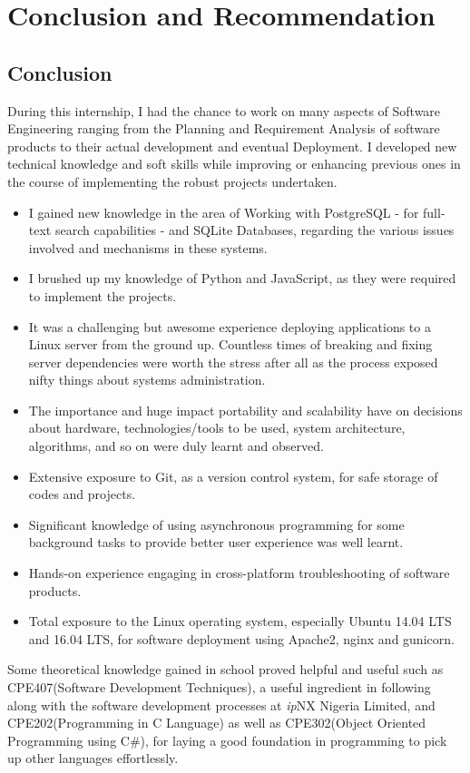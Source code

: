 \chapter{Conclusion and Recommendation}
\section{Conclusion}
During this internship, I had the chance to work on many aspects of Software Engineering ranging from the Planning and Requirement Analysis of software products to their actual development and eventual Deployment. I developed new technical knowledge and soft skills while improving or enhancing previous ones in the course of implementing the robust projects undertaken.
\begin{itemize}
	\item I gained new knowledge in the area of Working with PostgreSQL - for full-text search capabilities - and SQLite Databases, regarding the various issues involved and mechanisms in these systems.
	\item I brushed up my knowledge of Python and JavaScript, as they were required to implement the projects.
	\item It was a challenging but awesome experience deploying applications to a Linux server from the ground up. Countless times of breaking and fixing server dependencies were worth the stress after all as the process exposed nifty things about systems administration.
	\item The importance and huge impact portability and scalability have on decisions about hardware, technologies/tools to be used, system architecture, algorithms, and so on were duly learnt and observed.
	\item Extensive exposure to Git, as a version control system, for safe storage of codes and projects.
	\item Significant knowledge of using asynchronous programming for some background tasks to provide better user experience was well learnt.
	\item Hands-on experience engaging in cross-platform troubleshooting of software products.
	\item Total exposure to the Linux operating system, especially Ubuntu 14.04 LTS and 16.04 LTS, for software deployment using Apache2, nginx and gunicorn. 
\end{itemize}
Some theoretical knowledge gained in school proved helpful and useful such as CPE407(Software Development Techniques), a useful ingredient in following along with the software development processes at \textit{ip}NX Nigeria Limited, and CPE202(Programming in C Language) as well as CPE302(Object Oriented Programming using C\#), for laying a good foundation in programming to pick up other languages effortlessly.
